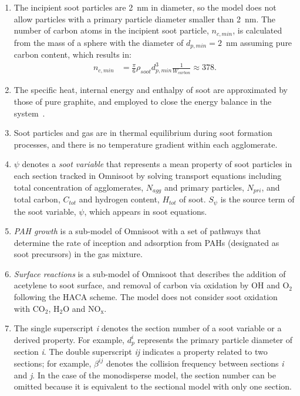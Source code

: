 \begin{enumerate}
\item The incipient soot particles are 2~nm in diameter, so the model does not allow particles with a primary particle diameter smaller than 2~nm. The number of carbon atoms in the incipient soot particle, $n_{c,min}$, is calculated from the mass of a sphere with the diameter of $d_{p,min}=2$~nm assuming pure carbon content, which results in:
\begin{equation}
	\begin{split}
	n_{c,min}& =\frac{\pi}{6}\rho_{soot}d^3_{p,min}\frac{1}{W_{carbon}}\approx378.
	\label{eqn:nc_min}
	\end{split}
\end{equation}


\item The specific heat, internal energy and enthalpy of soot are approximated by those of pure graphite, and employed to close the energy balance in the system~\cite{mcbride1993coefficients}.

\item Soot particles and gas are in thermal equilibrium during soot formation processes, and there is no temperature gradient within each agglomerate.


\item $\psi$ denotes a \textit{soot variable} that represents a mean property of soot particles in each section tracked in Omnisoot by solving transport equations including total concentration of agglomerates, $N_{agg}$ and primary particles, $N_{pri}$, and total carbon, $C_{tot}$ and hydrogen content, $H_{tot}$ of soot. $S_{\psi}$ is the source term of the soot variable, $\psi$, which appears in soot equations.  

\item \textit{PAH growth} is a sub-model of Omnisoot with a set of pathways that determine the rate of inception and adsorption from PAHs (designated as soot precursors) in the gas mixture.

\item \textit{Surface reactions} is a sub-model of Omnisoot that describes the addition of acetylene to soot surface, and removal of carbon via oxidation by OH and $\mathrm{O_2}$ following the HACA scheme. The model does not consider soot oxidation with $\mathrm{CO_2}$, $\mathrm{H_2O}$ and $\mathrm{NO_x}$.

\item The single superscript \textit{i} denotes the section number of a soot variable or a derived property. For example, $d^i_p$ represents the primary particle diameter of section \textit{i}. The double superscript \textit{ij} indicates a property related to two sections; for example, $\beta^{ij}$ denotes the collision frequency between sections \textit{i} and \textit{j}. In the case of the monodisperse model, the section number can be omitted because it is equivalent to the sectional model with only one section.



\end{enumerate}

